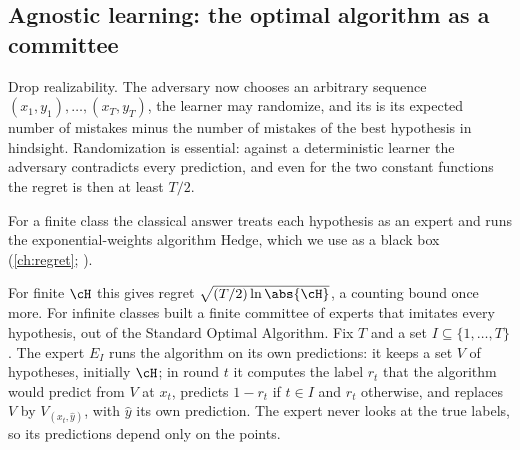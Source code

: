 \begin{refsection}
\subsection{Agnostic learning: the optimal algorithm as a committee}\label{sec:littlestone:agnostic}

Drop realizability. The adversary now chooses an arbitrary sequence $(x_1,y_1),\dots,(x_T,y_T)$, the learner may randomize, and its  is its expected number of mistakes minus the number of mistakes of the best hypothesis in hindsight. Randomization is essential: against a deterministic learner the adversary contradicts every prediction, and even for the two constant functions the regret is then at least $T/2$.

For a finite class the classical answer treats each hypothesis as an expert and runs the exponential-weights algorithm Hedge, which we use as a black box (\cref{ch:regret}; \cite{CesaBianchiLugosi2006}).


For finite $\cH$ this gives regret $\sqrt{(T/2)\ln\abs{\cH}}$, a counting bound once more. For infinite classes \textcite{BenDavidPalShalevShwartz2009} built a finite committee of experts that imitates every hypothesis, out of the Standard Optimal Algorithm. Fix $T$ and a set $I\subseteq\{1,\dots,T\}$. The expert $E_I$ runs the algorithm on its own predictions: it keeps a set $V$ of hypotheses, initially $\cH$; in round $t$ it computes the label $r_t$ that the algorithm would predict from $V$ at $x_t$, predicts $1-r_t$ if $t\in I$ and $r_t$ otherwise, and replaces $V$ by $V_{(x_t,\hat y)}$, with $\hat y$ its own prediction. The expert never looks at the true labels, so its predictions depend only on the points.



\end{refsection}
